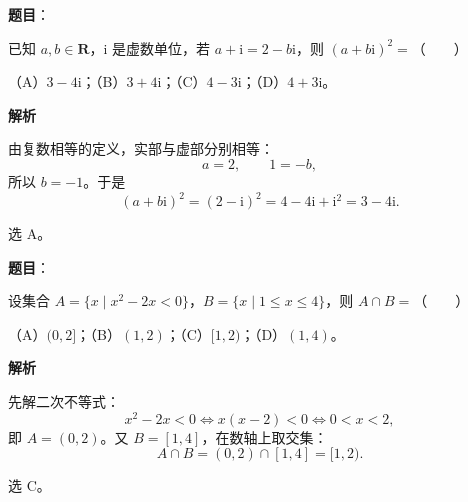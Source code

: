 

\begin{answer}

\textbf{题目}：

已知 $a,b\in\mathbf R$，$\mathrm i$ 是虚数单位，若 $a+\mathrm i=2-b\mathrm i$，则 $(a+b\mathrm i)^2=$\mbox{（　　）}

（A）$3-4\mathrm i$；（B）$3+4\mathrm i$；（C）$4-3\mathrm i$；（D）$4+3\mathrm i$。

\textbf{解析}

由复数相等的定义，实部与虚部分别相等：
\nopagebreak[4]
\[a=2,\qquad 1=-b,\]
所以 $b=-1$。于是
\nopagebreak[4]
\[(a+b\mathrm i)^2=(2-\mathrm i)^2=4-4\mathrm i+\mathrm i^2=3-4\mathrm i .\]

选 A。


\end{answer}
\begin{answer}

\textbf{题目}：

设集合 $A=\{x\mid x^2-2x<0\}$，$B=\{x\mid1\leqslant x\leqslant4\}$，则 $A\cap B=$\mbox{（　　）}

（A）$(0,2]$；（B）$(1,2)$；（C）$[1,2)$；（D）$(1,4)$。

\textbf{解析}

先解二次不等式：
\nopagebreak[4]
\[x^2-2x<0\iff x(x-2)<0\iff 0<x<2,\]
即 $A=(0,2)$。又 $B=[1,4]$，在数轴上取交集：
\nopagebreak[4]
\[A\cap B=(0,2)\cap[1,4]=[1,2).\]

选 C。

\gkanswer{答案：C。$x^2-2x<0\iff0<x<2$，与 $B=[1,4]$ 取交得 $[1,2)$。}

\end{answer}
